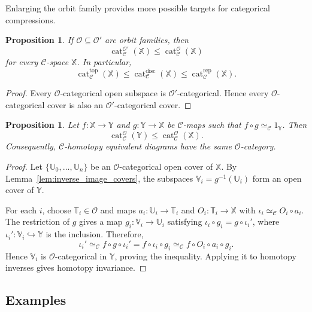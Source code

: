 \documentclass[12pt]{amsart}
\newtheorem{prop}[teo]{Proposition}
\theoremstyle{definition}
\theoremstyle{remark}
\numberwithin{figure}{section}%
\newcommand{\CC}{\mathcal{C}}
\newcommand{\cat}{\mathop{\mathrm{cat}}}
\newcommand{\X}{\mathbb{X}}
\newcommand{\Y}{\mathbb{Y}}
\newcommand{\V}{\mathbb{V}}
\newcommand{\T}{\mathbb{T}}
\newcommand{\Uu}{\mathbb{U}}
\begin{document}
Enlarging the orbit family provides more possible targets for
categorical compressions.

\begin{prop}\label{prop:monotonicity-orbit-family}
If $\mathcal O\subseteq\mathcal O'$ are orbit families, then
\[
\cat_{\CC}^{\mathcal O'}(\X)
\leq
\cat_{\CC}^{\mathcal O}(\X)
\]
for every $\CC$-space $\X$. In particular,
\[
\cat_{\CC}^{\mathrm{top}}(\X)
\leq
\cat_{\CC}^{\mathrm{disc}}(\X)
\leq
\cat_{\CC}^{\mathrm{rep}}(\X).
\]
\end{prop}

\begin{proof}
Every $\mathcal O$-categorical open subspace is
$\mathcal O'$-categorical. Hence every $\mathcal O$-categorical cover
is also an $\mathcal O'$-categorical cover.
\end{proof}


\begin{prop}\label{prop:category-domination}
Let $f\colon\X\to\Y$ and $g\colon\Y\to\X$ be $\CC$-maps such that
$f\circ g\simeq_{\CC}1_{\Y}$. Then
\[
\cat_{\CC}^{\mathcal O}(\Y)
\leq
\cat_{\CC}^{\mathcal O}(\X).
\]
Consequently, $\CC$-homotopy equivalent diagrams have the same
$\mathcal O$-category.
\end{prop}

\begin{proof}
Let $\{\Uu_0,\ldots,\Uu_n\}$ be an $\mathcal O$-categorical open cover
of $\X$. By Lemma~\ref{lem:inverse_image_covers}, the subspaces
$\V_i=g^{-1}(\Uu_i)$ form an open cover of $\Y$.

For each $i$, choose $\T_i\in\mathcal O$ and maps
$a_i\colon\Uu_i\to\T_i$ and $O_i\colon\T_i\to\X$ with
$\iota_i\simeq_{\CC}O_i\circ a_i$. The restriction of $g$ gives a map
$g_i\colon\V_i\to\Uu_i$ satisfying
$\iota_i\circ g_i=g\circ\iota_i'$, where
$\iota_i'\colon\V_i\hookrightarrow\Y$ is the inclusion. Therefore,
\[
\iota_i'
\simeq_{\CC}
f\circ g\circ\iota_i'
=
f\circ\iota_i\circ g_i
\simeq_{\CC}
f\circ O_i\circ a_i\circ g_i.
\]
Hence $\V_i$ is $\mathcal O$-categorical in $\Y$, proving the
inequality. Applying it to homotopy inverses gives homotopy invariance.
\end{proof}

\subsection{Examples}
\end{document}
